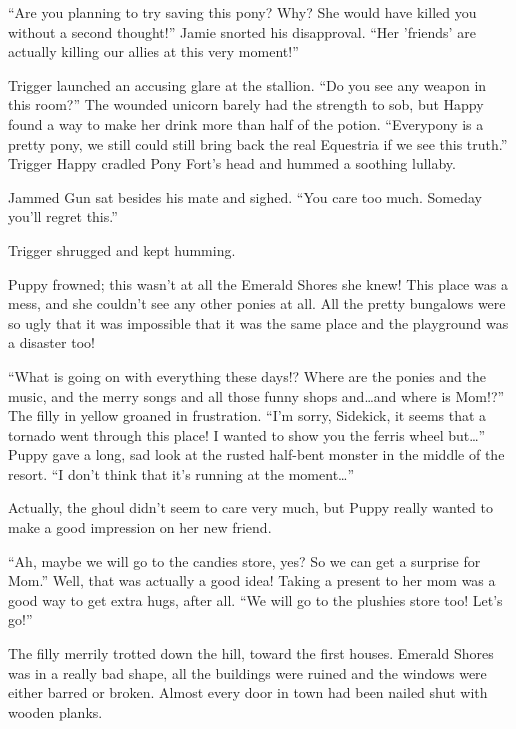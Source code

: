 ``Are you planning to try saving this pony? Why? She would have killed you without a second thought!'' Jamie snorted his disapproval. ``Her 'friends' are actually killing our allies at this very moment!''

Trigger launched an accusing glare at the stallion. ``Do you see any weapon in this room?'' The wounded unicorn barely had the strength to sob, but Happy found a way to make her drink more than half of the potion. ``Everypony is a pretty pony, we still could still bring back the real Equestria if we see this truth.'' Trigger Happy cradled Pony Fort's head and hummed a soothing lullaby.

Jammed Gun sat besides his mate and sighed. ``You care too much. Someday you'll regret this.''

Trigger shrugged and kept humming.

\horizonline


Puppy frowned; this wasn't at all the Emerald Shores she knew! This place was a mess, and she couldn't see any other ponies at all. All the pretty bungalows were so ugly that it was impossible that it was the same place and the playground was a disaster too!

``What is going on with everything these days!? Where are the ponies and the music, and the merry songs and all those funny shops and\dots and where is Mom!?'' The filly in yellow groaned in frustration. ``I'm sorry, Sidekick, it seems that a tornado went through this place! I wanted to show you the ferris wheel but\dots'' Puppy gave a long, sad look at the rusted half-bent monster in the middle of the resort. ``I don't think that it's running at the moment\dots''

Actually, the ghoul didn't seem to care very much, but Puppy really wanted to make a good impression on her new friend.

``Ah, maybe we will go to the candies store, yes? So we can get a surprise for Mom.'' Well, that was actually a good idea! Taking a present to her mom was a good way to get extra hugs, after all. ``We will go to the plushies store too! Let's go!''

The filly merrily trotted down the hill, toward the first houses. Emerald Shores was in a really bad shape, all the buildings were ruined and the windows were either barred or broken. Almost every door in town had been nailed shut with wooden planks.

